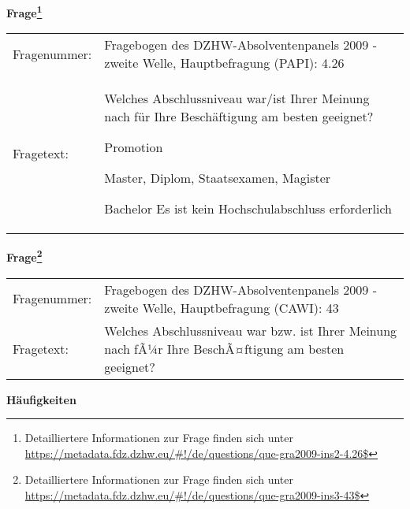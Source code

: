 				\vspace*{0.5cm}
                \noindent\textbf{Frage\footnote{Detailliertere Informationen zur Frage finden sich unter
		              \url{https://metadata.fdz.dzhw.eu/\#!/de/questions/que-gra2009-ins2-4.26$}}}\\
				\begin{tabularx}{\hsize}{@{}lX}
					Fragenummer: &
					  Fragebogen des DZHW-Absolventenpanels 2009 - zweite Welle, Hauptbefragung (PAPI):
					  4.26
 \\
					Fragetext: & Welches Abschlussniveau war/ist Ihrer Meinung nach für Ihre Beschäftigung am besten geeignet?\par  Promotion\par  Master, Diplom, Staatsexamen, Magister\par  Bachelor Es ist kein Hochschulabschluss erforderlich \\
				\end{tabularx}
				\vspace*{0.5cm}
                \noindent\textbf{Frage\footnote{Detailliertere Informationen zur Frage finden sich unter
		              \url{https://metadata.fdz.dzhw.eu/\#!/de/questions/que-gra2009-ins3-43$}}}\\
				\begin{tabularx}{\hsize}{@{}lX}
					Fragenummer: &
					  Fragebogen des DZHW-Absolventenpanels 2009 - zweite Welle, Hauptbefragung (CAWI):
					  43
 \\
					Fragetext: & Welches Abschlussniveau war bzw. ist Ihrer Meinung nach fÃ¼r Ihre BeschÃ¤ftigung am besten geeignet? \\
				\end{tabularx}





        		\vspace*{0.5cm}
                \noindent\textbf{Häufigkeiten}

